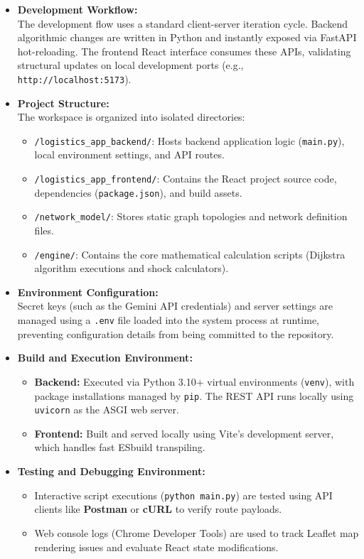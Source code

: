 \begin{itemize}
    \item \textbf{Development Workflow:} \\
    The development flow uses a standard client-server iteration cycle. Backend algorithmic changes are written in Python and instantly exposed via FastAPI hot-reloading. The frontend React interface consumes these APIs, validating structural updates on local development ports (e.g., \texttt{http://localhost:5173}).
    \item \textbf{Project Structure:} \\
    The workspace is organized into isolated directories:
    \begin{itemize}
        \item \texttt{/logistics\_app\_backend/}: Hosts backend application logic (\texttt{main.py}), local environment settings, and API routes.
        \item \texttt{/logistics\_app\_frontend/}: Contains the React project source code, dependencies (\texttt{package.json}), and build assets.
        \item \texttt{/network\_model/}: Stores static graph topologies and network definition files.
        \item \texttt{/engine/}: Contains the core mathematical calculation scripts (Dijkstra algorithm executions and shock calculators).
    \end{itemize}
    \item \textbf{Environment Configuration:} \\
    Secret keys (such as the Gemini API credentials) and server settings are managed using a \texttt{.env} file loaded into the system process at runtime, preventing configuration details from being committed to the repository.
    \item \textbf{Build and Execution Environment:}
    \begin{itemize}
        \item \textbf{Backend:} Executed via Python 3.10+ virtual environments (\texttt{venv}), with package installations managed by \texttt{pip}. The REST API runs locally using \texttt{uvicorn} as the ASGI web server.
        \item \textbf{Frontend:} Built and served locally using Vite's development server, which handles fast ESbuild transpiling.
    \end{itemize}
    \item \textbf{Testing and Debugging Environment:}
    \begin{itemize}
        \item Interactive script executions (\texttt{python main.py}) are tested using API clients like \textbf{Postman} or \textbf{cURL} to verify route payloads.
        \item Web console logs (Chrome Developer Tools) are used to track Leaflet map rendering issues and evaluate React state modifications.
    \end{itemize}
\end{itemize}

